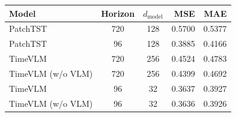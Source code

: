\begin{tabular}{lccrr}
\toprule
Model & Horizon & $d_\text{model}$ & MSE & MAE \\
\midrule
PatchTST & 720 & 128 & 0.5700 & 0.5377 \\
PatchTST & 96 & 128 & 0.3885 & 0.4166 \\
TimeVLM & 720 & 256 & 0.4524 & 0.4783 \\
TimeVLM (w/o VLM) & 720 & 256 & 0.4399 & 0.4692 \\
TimeVLM & 96 & 32 & 0.3637 & 0.3927 \\
TimeVLM (w/o VLM) & 96 & 32 & 0.3636 & 0.3926 \\
\bottomrule
\end{tabular}
